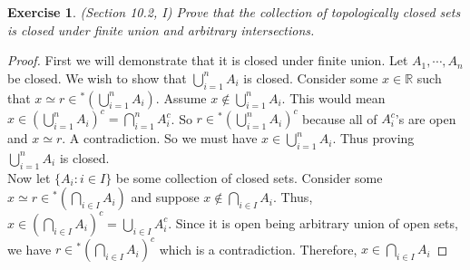 \documentclass[a4paper, 11pt, openany]{book}
\theoremstyle{plain}
\newtheorem{exercise}{Exercise}[chapter]
\theoremstyle{plain}
\newcommand{\R}{\mathbb{R}}
\newcommand{\hyp}{{}^*}
\begin{document}
    \begin{exercise}
      (Section 10.2, I)
      Prove that the collection of topologically closed sets is closed under finite union and arbitrary intersections.
    \end{exercise}
    \begin{proof}
      First we will demonstrate that it is closed under finite union. Let $A_1, \cdots, A_n$ be closed. We wish to show that $\bigcup_{i=1}^n A_i$ is closed. Consider some $x \in \R$ such that $x \simeq r \in \hyp \left(\bigcup_{i=1}^n A_i \right)$. Assume $x \notin \bigcup_{i=1}^n A_i$. This would mean $x \in \left( \bigcup_{i=1}^n A_i \right)^c=\bigcap_{i=1}^n A_i^c$. So $r \in \hyp\left( \bigcup_{i=1}^n A_i \right)^c$ because all of $A_i^c$'s are open and $x \simeq r$. A contradiction. So we must have $x \in  \bigcup_{i=1}^n A_i$. Thus proving $\bigcup_{i=1}^n A_i$ is closed. \\
      Now let $\{A_i: i \in I\}$ be some collection of closed sets. Consider some $x \simeq r \in \hyp \left(\bigcap_{i \in I} A_i \right)$ and suppose $x \notin \bigcap_{i \in I} A_i$. Thus, $x \in \left(\bigcap_{i \in I} A_i \right)^c=\bigcup_{i \in I} A_i^c$. Since it is open being arbitrary union of open sets, we have $r \in \hyp\left(\bigcap_{i \in I} A_i\right)^c$ which is a contradiction. Therefore, $x \in \bigcap_{i \in I} A_i$
    \end{proof}
\end{document}
